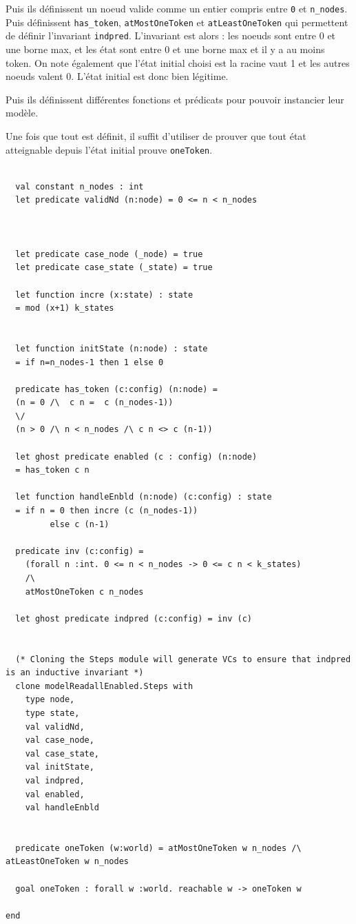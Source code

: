\documentclass[11pt]{article}
\begin{document}
Puis ils définissent un noeud valide comme un entier compris entre \texttt{0} et \texttt{n\_nodes}.
Puis définissent \texttt{has\_token}, \texttt{atMostOneToken} et \texttt{atLeastOneToken} qui permettent de définir l'invariant \texttt{indpred}.
L'invariant est alors : les noeuds sont entre 0 et une borne max, et les état sont entre 0 et une borne max et il y a au moins token.
On note également que l'état initial choisi est la racine vaut 1 et les autres noeuds valent 0.
L'état initial est donc bien légitime.

Puis ils définissent différentes fonctions et prédicats pour pouvoir instancier leur modèle.

Une fois que tout est définit, il suffit d'utiliser de prouver que tout état atteignable depuis l'état initial prouve \texttt{oneToken}.

\lstset{language=why3,label= ,caption= ,captionpos=b,numbers=none}
\begin{lstlisting}

  val constant n_nodes : int
  let predicate validNd (n:node) = 0 <= n < n_nodes



  let predicate case_node (_node) = true
  let predicate case_state (_state) = true

  let function incre (x:state) : state
  = mod (x+1) k_states


  let function initState (n:node) : state
  = if n=n_nodes-1 then 1 else 0

  predicate has_token (c:config) (n:node) =
  (n = 0 /\  c n =  c (n_nodes-1))
  \/
  (n > 0 /\ n < n_nodes /\ c n <> c (n-1))

  let ghost predicate enabled (c : config) (n:node)
  = has_token c n

  let function handleEnbld (n:node) (c:config) : state
  = if n = 0 then incre (c (n_nodes-1))
	     else c (n-1)

  predicate inv (c:config) =
    (forall n :int. 0 <= n < n_nodes -> 0 <= c n < k_states)
    /\
    atMostOneToken c n_nodes

  let ghost predicate indpred (c:config) = inv (c)


  (* Cloning the Steps module will generate VCs to ensure that indpred is an inductive invariant *)
  clone modelReadallEnabled.Steps with
    type node,
    type state,
    val validNd,
    val case_node,
    val case_state,
    val initState,
    val indpred,
    val enabled,
    val handleEnbld


  predicate oneToken (w:world) = atMostOneToken w n_nodes /\ atLeastOneToken w n_nodes

  goal oneToken : forall w :world. reachable w -> oneToken w

end



\end{lstlisting}
\end{document}
